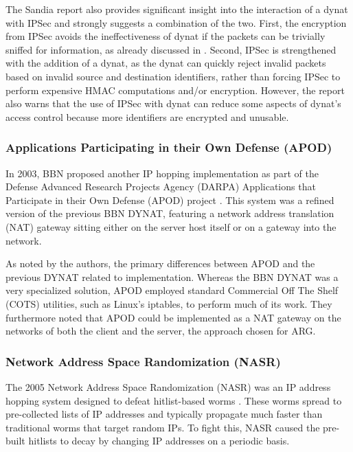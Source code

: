 \par The Sandia report also provides significant insight into the interaction of a dynat with IPSec and strongly suggests a combination of the two. First, the encryption from IPSec avoids the ineffectiveness of dynat if the packets can be trivially sniffed for information, as already discussed in \cite{BBNDYNAT}. Second, IPSec is strengthened with the addition of a dynat, as the dynat can quickly reject invalid packets based on invalid source and destination identifiers, rather than forcing IPSec to perform expensive HMAC computations and/or encryption. However, the report also warns that the use of IPSec with dynat can reduce some aspects of dynat's access control because more identifiers are encrypted and unusable.

\subsubsection{Applications Participating in their Own Defense (APOD)}
\par In 2003, BBN proposed another IP hopping implementation as part of the Defense Advanced Research Projects Agency (DARPA) Applications that Participate in their Own Defense (APOD) project \cite{APOD}. This system was a refined version of the previous BBN DYNAT, featuring a network address translation (NAT) gateway sitting either on the server host itself or on a gateway into the network.

\par As noted by the authors, the primary differences between APOD and the previous DYNAT related to implementation. Whereas the BBN DYNAT was a very specialized solution, APOD employed standard Commercial Off The Shelf (COTS) utilities, such as Linux's iptables, to perform much of its work. They furthermore noted that APOD could be implemented as a NAT gateway on the networks of both the client and the server, the approach chosen for ARG.

\subsubsection{Network Address Space Randomization (NASR)}
\par The 2005 Network Address Space Randomization (NASR) was an IP address hopping system designed to defeat hitlist-based worms \cite{NASR}. These worms spread to pre-collected lists of IP addresses and typically propagate much faster than traditional worms that target random IPs. To fight this, NASR caused the pre-built hitlists to decay by changing IP addresses on a periodic basis.

